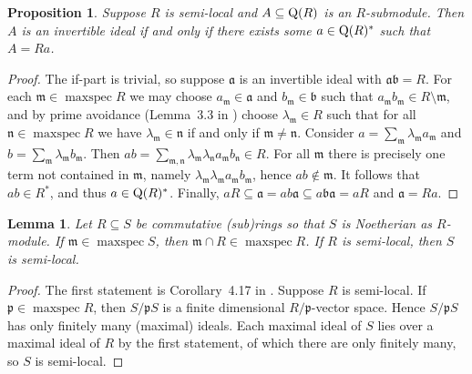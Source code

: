 \documentclass{amsart}
\theoremstyle{plain}
\newtheorem{lemma}[theorem]{Lemma}
\newtheorem{proposition}[theorem]{Proposition}
\theoremstyle{definition}
\DeclareMathOperator{\maxspec}{maxspec}
\newcommand{\fm}{\ensuremath{\mathfrak{m}}}
\newcommand{\fn}{\ensuremath{\mathfrak{n}}}
\newcommand{\fp}{\ensuremath{\mathfrak{p}}}
\begin{document}
\begin{proposition}\label{prop:semi_loc_inv}
Suppose \(R\) is semi-local and \(A\subseteq\textup{Q}(R)\) is an \(R\)-submodule. Then \(A\) is an invertible ideal if and only if there exists some \(a\in\textup{Q}(R)^*\) such that \(A=Ra\).
\end{proposition}
\begin{proof}
The if-part is trivial, so suppose \(\mathfrak{a}\) is an invertible ideal with \(\mathfrak{ab}=R\). 
For each \(\fm\in\maxspec R\) we may choose \(a_\fm\in \mathfrak{a}\) and \(b_\fm\in \mathfrak{b}\) such that \(a_\fm b_\fm \in R\setminus \fm\), and by prime avoidance (Lemma~3.3 in \cite{Eisenbud}) choose \(\lambda_\fm\in R\) such that for all \(\fn\in\maxspec R\) we have \(\lambda_\fm \in \fn\) if and only if \(\fm\neq\fn\).
Consider \(a=\sum_\fm \lambda_\fm a_\fm\) and \(b=\sum_\fm \lambda_\fm b_\fm\). Then \(ab=\sum_{\fm,\fn} \lambda_\fm \lambda_{\fn} a_\fm b_{\fn} \in R\).
For all \(\fm\) there is precisely one term not contained in \(\fm\), namely \(\lambda_\fm \lambda_\fm a_\fm b_{\fm}\), hence \(ab\not\in \fm\).
It follows that \(ab\in R^*\), and thus \(a\in\textup{Q}(R)^*\). 
Finally, \(aR \subseteq \mathfrak{a} = ab \mathfrak{a} \subseteq a \mathfrak{ba} = aR\) and \(\mathfrak{a}=Ra\).
\end{proof}

\begin{lemma}\label{lem:semi-local}
Let \(R\subseteq S\) be commutative (sub)rings so that \(S\) is Noetherian as \(R\)-module.
If \(\fm\in\maxspec S\), then \(\fm\cap R\in\maxspec R\). 
If \(R\) is semi-local, then \(S\) is semi-local.
\end{lemma}
\begin{proof}
The first statement is Corollary~4.17 in \cite{Eisenbud}.
Suppose \(R\) is semi-local. 
If \(\fp\in\maxspec R\), then \(S/\fp S\) is a finite dimensional \(R/\fp\)-vector space. 
Hence \(S/\fp S\) has only finitely many (maximal) ideals.
Each maximal ideal of \(S\) lies over a maximal ideal of \(R\) by the first statement, of which there are only finitely many, so \(S\) is semi-local.
\end{proof}
\end{document}
